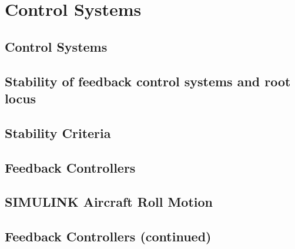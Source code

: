 \documentclass[12pt,letter]{article}
\begin{document}
	
%	

	\setcounter{section}{6}	
	\setcounter{figure}{\thesection}   
	\renewcommand\thefigure{\thesection.\arabic{figure}}
	\setcounter{equation}{\thesection}   
	\renewcommand\theequation{\thesection.\arabic{equation}}

\section{Control Systems}

\subsection{Control Systems}


\subsection{Stability of feedback control systems and root locus}


\subsection{Stability Criteria}


\subsection{Feedback Controllers}


\subsection{SIMULINK Aircraft Roll Motion}


\subsection{Feedback Controllers (continued)}

\end{document}
